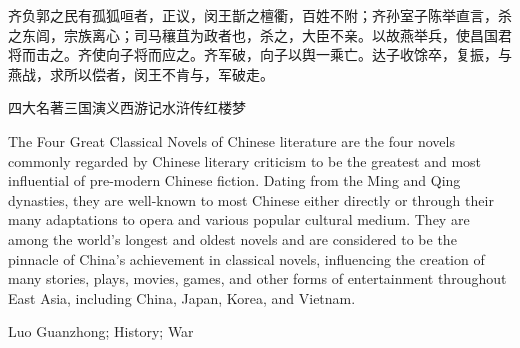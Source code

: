 \begin{abstractcn}
齐负郭之民有孤狐咺者，正议，闵王斮之檀衢，百姓不附；齐孙室子陈举直言，杀之东闾，宗族离心；司马穰苴为政者也，杀之，大臣不亲。以故燕举兵，使昌国君将而击之。齐使向子将而应之。齐军破，向子以舆一乘亡。达子收馀卒，复振，与燕战，求所以偿者，闵王不肯与，军破走。
\end{abstractcn}

\begin{keywordscn}
四大名著\quad 三国演义\quad 西游记\quad 水浒传\quad 红楼梦
\end{keywordscn}

\begin{abstracten}
The Four Great Classical Novels of Chinese literature are the four novels commonly regarded by Chinese literary criticism to be the greatest and most influential of pre-modern Chinese fiction. Dating from the Ming and Qing dynasties, they are well-known to most Chinese either directly or through their many adaptations to opera and various popular cultural medium. They are among the world's longest and oldest novels and are considered to be the pinnacle of China's achievement in classical novels, influencing the creation of many stories, plays, movies, games, and other forms of entertainment throughout East Asia, including China, Japan, Korea, and Vietnam.
\end{abstracten}

\begin{keywordsen}
Luo Guanzhong; History; War
\end{keywordsen}
